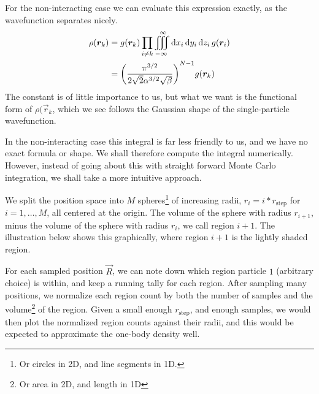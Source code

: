 \documentclass[twocolumn]{article}
\begin{document}
For the non-interacting case we can evaluate this expression exactly, as the
wavefunction separates nicely.
\begin{align}
    \begin{split}
        \rho(\bm r_k)&=g(\bm r_k)\prod_{i\neq k}\iiint_{-\infty}^\infty
        \dd{x_i}\dd{y_i}\dd{z_i}g(\bm r_i)\\
        &= \qty(\frac{\pi^{3/2}}{2\sqrt{2}\alpha^{3/2}\sqrt{\beta}})^{N-1}
        g(\bm r_k)\\
    \end{split}\label{eq:one-body-exact}
\end{align}
The constant is of little importance to us, but what we want is the functional
form of $\rho(\vec r_k$, which we see follows the Gaussian shape of the
single-particle wavefunction.

In the non-interacting case this integral is far less friendly to us, and we have no
exact formula or shape. We shall therefore compute the integral numerically. However, 
instead of going about this with straight forward Monte Carlo integration, we
shall take a more intuitive approach.

We split the position space into $M$ spheres\footnote{Or circles in 2D, and line
segments in 1D.} of increasing radii, $r_i=i * r_\text{step}$ for $i=1,\dots,M$,
all centered at the origin. The volume of the sphere with radius $r_{i+1}$, minus
the volume of the sphere with radius $r_i$, we call region $i+1$. The
illustration below shows this graphically, where region $i+1$ is the lightly
shaded region.

\begin{center}
\end{center}

For each sampled position $\vec R$, we can note down which region particle $1$
(arbitrary choice) is within, and keep a running tally for each region. After
sampling many positions, we normalize each region count by both the number of
samples and the volume\footnote{Or area in 2D, and length in 1D} of the
region. Given a small enough $r_\text{step}$, and enough samples, we would then
plot the normalized region counts against their radii, and this would be expected
to approximate the one-body density well.
\end{document}
